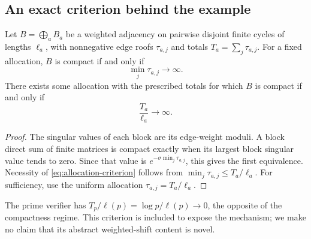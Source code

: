 \subsection{An exact criterion behind the example}

\begin{proposition}
\label{prop:compactness-criterion}
Let $B=\bigoplus_a B_a$ be a weighted adjacency on pairwise disjoint finite
cycles of lengths $\ell_a$, with nonnegative edge roofs $\tau_{a,j}$ and
totals $T_a=\sum_j\tau_{a,j}$.  For a fixed allocation, $B$ is compact if
and only if
\[
\min_j\tau_{a,j}\longrightarrow\infty.
\]
There exists some allocation with the prescribed totals for which $B$ is
compact if and only if
\begin{equation}
\frac{T_a}{\ell_a}\longrightarrow\infty.
\label{eq:allocation-criterion}
\end{equation}
\end{proposition}

\begin{proof}
The singular values of each block are its edge-weight moduli.  A block direct
sum of finite matrices is compact exactly when its largest block singular
value tends to zero.  Since that value is
$e^{-\sigma\min_j\tau_{a,j}}$, this gives the first equivalence.  Necessity
of
\eqref{eq:allocation-criterion} follows from
$\min_j\tau_{a,j}\le T_a/\ell_a$.  For sufficiency, use the uniform
allocation $\tau_{a,j}=T_a/\ell_a$.
\end{proof}

The prime verifier has
$T_p/\ell(p)=\log p/\ell(p)\to0$, the opposite of the compactness regime.
This criterion is included to expose the mechanism; we make no claim that
its abstract weighted-shift content is novel.
